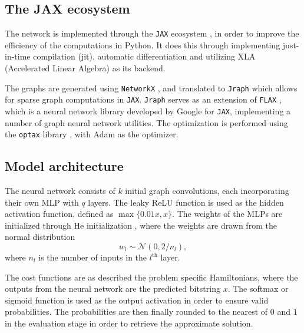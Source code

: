 \subsection{The JAX ecosystem}
The network is implemented through the \verb|JAX| ecosystem \cite{jax2018github}, in order to improve the efficiency of the computations in Python.
It does this through implementing just-in-time compilation (jit), automatic differentiation and utilizing XLA (Accelerated Linear Algebra) as its backend.

The graphs are generated using \verb|NetworkX| \cite{SciPyProceedings_11}, and translated to \verb|Jraph| \cite{jraph2020github} which allows for sparse graph computations in \verb|JAX|.
\verb|Jraph| serves as an extension of \verb|FLAX| \cite{flax2020github}, which is a neural network library developed by Google for \verb|JAX|, implementing a number of graph neural network utilities.
The optimization is performed using the \verb|optax| library \cite{deepmind2020jax}, with Adam \cite{kingma2017adam} as the optimizer.

\subsection{Model architecture}
The neural network consists of $k$ initial graph convolutions, each incorporating their own MLP with $q$ layers.
The leaky ReLU function is used as the hidden activation function, defined as $\max\{ 0.01x, x \}$.
The weights of the MLPs are initialized through He initialization \cite{he2015delving}, where the weights are drawn from the normal distribution
\begin{equation}
    w_l \sim \mathcal{N}(0, 2/n_l),
\end{equation}
where $n_l$ is the number of inputs in the $l^{\text{th}}$ layer.

The cost functions are as described the problem specific Hamiltonians, where the outputs from the neural network are the predicted bitstring $x$.
The softmax or sigmoid function is used as the output activation in order to ensure valid probabilities.
The probabilities are then finally rounded to the nearest of $0$ and $1$ in the evaluation stage in order to retrieve the approximate solution.